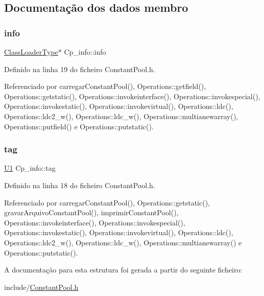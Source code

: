 \subsection{Documentação dos dados membro}
\mbox{\label{structCp__info_ace48d3773256ae8a504dea48352c0b93}} 
\subsubsection{\texorpdfstring{info}{info}}
{\footnotesize\ttfamily \hyperlink{unionClassLoaderType}{Class\+Loader\+Type}$\ast$ Cp\+\_\+info\+::info}



Definido na linha 19 do ficheiro Constant\+Pool.\+h.



Referenciado por carregar\+Constant\+Pool(), Operations\+::getfield(), Operations\+::getstatic(), Operations\+::invokeinterface(), Operations\+::invokespecial(), Operations\+::invokestatic(), Operations\+::invokevirtual(), Operations\+::ldc(), Operations\+::ldc2\+\_\+w(), Operations\+::ldc\+\_\+w(), Operations\+::multianewarray(), Operations\+::putfield() e Operations\+::putstatic().

\mbox{\label{structCp__info_a74ba6be7ad12511cc5df37e43984add0}} 
\subsubsection{\texorpdfstring{tag}{tag}}
{\footnotesize\ttfamily \hyperlink{BasicTypes_8h_a9bffe5bb2564f91cd90fb7d06848f9a8}{U1} Cp\+\_\+info\+::tag}



Definido na linha 18 do ficheiro Constant\+Pool.\+h.



Referenciado por carregar\+Constant\+Pool(), Operations\+::getstatic(), gravar\+Arquivo\+Constant\+Pool(), imprimir\+Constant\+Pool(), Operations\+::invokeinterface(), Operations\+::invokespecial(), Operations\+::invokestatic(), Operations\+::invokevirtual(), Operations\+::ldc(), Operations\+::ldc2\+\_\+w(), Operations\+::ldc\+\_\+w(), Operations\+::multianewarray() e Operations\+::putstatic().



A documentação para esta estrutura foi gerada a partir do seguinte ficheiro\+:\begin{DoxyCompactItemize}
\item 
include/\hyperlink{ConstantPool_8h}{Constant\+Pool.\+h}\end{DoxyCompactItemize}
